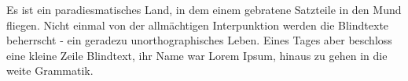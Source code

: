 \documentclass[%
	12pt,%
	a4paper,%
	oneside,%
	liststotoc, idxtotoc, bibtotoc, %
	parskip=half,%
	nochapterprefix,%
	appendixprefix, %
	headings=small,%
]{scrreprt}
\begin{document}
Es ist ein paradiesmatisches Land, in dem einem gebratene Satzteile in den Mund fliegen. Nicht einmal von der allmächtigen Interpunktion werden die Blindtexte beherrscht - ein geradezu unorthographisches Leben. Eines Tages aber beschloss eine kleine Zeile Blindtext, ihr Name war Lorem Ipsum, hinaus zu gehen in die weite Grammatik.


\end{document}
